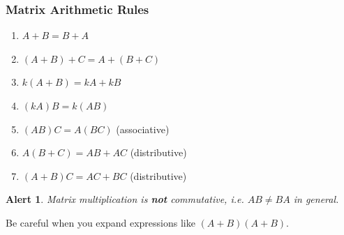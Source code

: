 \documentclass{beamer}
\newtheorem{Alert}{Alert}
\begin{document}
\begin{frame}
  \frametitle{Matrix Arithmetic Rules}

\begin{enumerate}[i]
	\item $A + B = B + A$
	\item $(A + B) + C = A + (B + C)$ 
	\item $k(A + B) = kA + kB$ 
	\item $(kA)B = k(AB)$
	\item $(AB)C = A(BC)$ (associative)
	\item $A(B+C) = AB + AC$ (distributive)
	\item $(A+B)C = AC + BC$ (distributive)
\end{enumerate}

\begin{Alert}
Matrix multiplication is \emph{\textbf{not}} commutative, i.e. $AB \neq BA$ in general.
\end{Alert}

\begin{center}
\begin{footnotesize}
Be careful when you expand expressions like $(A+B)(A+B)$.
\end{footnotesize}
\end{center}

\end{frame}

\end{document}
